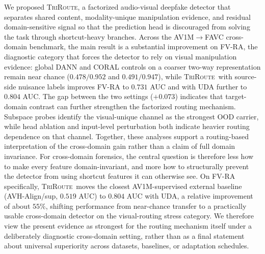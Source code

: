 \documentclass{article}
\newcommand{\method}{\textsc{TriRoute}}
\begin{document}
We proposed \method, a factorized audio-visual deepfake detector that separates shared content, modality-unique manipulation evidence, and residual domain-sensitive signal so that the prediction head is discouraged from solving the task through shortcut-heavy branches. Across the AV1M$\rightarrow$FAVC cross-domain benchmark, the main result is a substantial improvement on FV-RA, the diagnostic category that forces the detector to rely on visual manipulation evidence: global DANN and CORAL controls on a coarser two-way representation remain near chance ($0.478/0.952$ and $0.491/0.947$), while \method\ with source-side nuisance labels improves FV-RA to $0.731$ AUC and with UDA further to $0.804$ AUC. The gap between the two settings ($+0.073$) indicates that target-domain contrast can further strengthen the factorized routing mechanism. Subspace probes identify the visual-unique channel as the strongest OOD carrier, while head ablation and input-level perturbation both indicate heavier routing dependence on that channel. Together, these analyses support a routing-based interpretation of the cross-domain gain rather than a claim of full domain invariance. For cross-domain forensics, the central question is therefore less how to make every feature domain-invariant, and more how to structurally prevent the detector from using shortcut features it can otherwise see.
On FV-RA specifically, \method\ moves the closest AV1M-supervised external baseline (AVH-Align/sup, $0.519$ AUC) to $0.804$ AUC with UDA, a relative improvement of about $55\%$, shifting performance from near-chance transfer to a practically usable cross-domain detector on the visual-routing stress category.
We therefore view the present evidence as strongest for the routing mechanism itself under a deliberately diagnostic cross-domain setting, rather than as a final statement about universal superiority across datasets, baselines, or adaptation schedules.




\newpage

\end{document}
